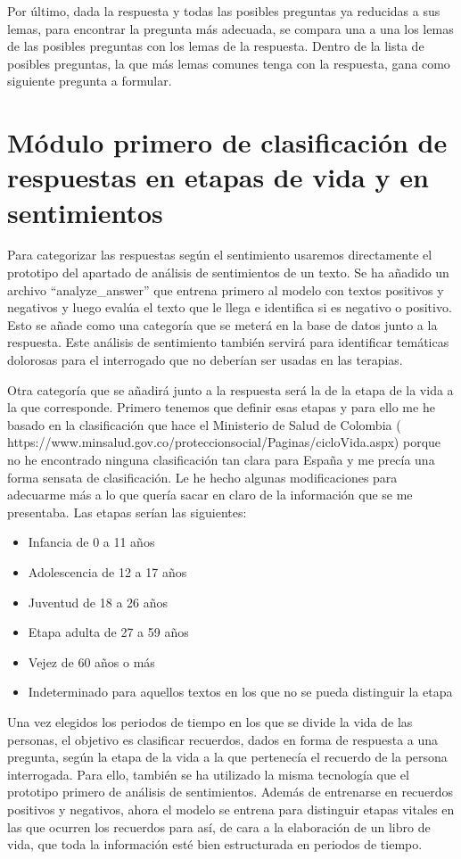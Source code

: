 Por último, dada la respuesta y todas las posibles preguntas ya reducidas a sus lemas, para encontrar la pregunta más adecuada, se compara una a una los lemas de las posibles preguntas con los lemas de la respuesta. Dentro de la lista de posibles preguntas, la que más lemas comunes tenga con la respuesta, gana como siguiente pregunta a formular.

\section{Módulo primero de clasificación de respuestas en etapas de vida y en sentimientos}

Para categorizar las respuestas según el sentimiento usaremos directamente el prototipo del apartado de análisis de sentimientos de un texto. Se ha añadido un archivo ``analyze\_answer'' que entrena primero al modelo con textos positivos y negativos y luego evalúa el texto que le llega e identifica si es negativo o positivo. Esto se añade como una categoría que se meterá en la base de datos junto a la respuesta. Este análisis de sentimiento también servirá para identificar temáticas dolorosas para el interrogado que no deberían ser usadas en las terapias. 

Otra categoría que se añadirá junto a la respuesta será la de la etapa de la vida a la que corresponde. Primero tenemos que definir esas etapas y para ello me he basado en la clasificación que hace el Ministerio de Salud de Colombia ( https://www.minsalud.gov.co/proteccionsocial/Paginas/cicloVida.aspx) porque no he encontrado ninguna clasificación tan clara para España y me precía una forma sensata de clasificación. Le he hecho algunas modificaciones para adecuarme más a lo que quería sacar en claro de la información que se me presentaba. Las etapas serían las siguientes:
\begin{itemize}
	\item Infancia de 0 a 11 años
	\item Adolescencia de 12 a 17 años
	\item Juventud de 18 a 26 años
	\item Etapa adulta de 27 a 59 años
	\item Vejez de 60 años o más
	\item Indeterminado para aquellos textos en los que no se pueda distinguir la etapa
\end{itemize}

Una vez elegidos los periodos de tiempo en los que se divide la vida de las personas, el objetivo es clasificar recuerdos, dados en forma de respuesta a una pregunta, según la etapa de la vida a la que pertenecía el recuerdo de la persona interrogada. Para ello, también se ha utilizado la misma tecnología que el prototipo primero de análisis de sentimientos. Además de entrenarse en recuerdos positivos y negativos, ahora el modelo se entrena para distinguir etapas vitales en las que ocurren los recuerdos para así, de cara a la elaboración de un libro de vida, que toda la información esté bien estructurada en periodos de tiempo. 

